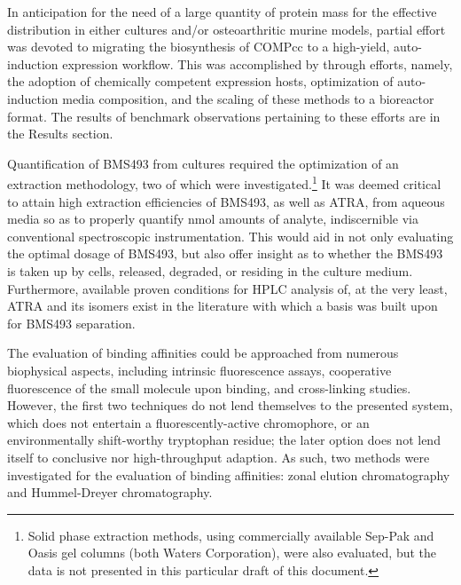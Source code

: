 \begin{refsection}
\begin{description}
\end{description}
In anticipation for the need of a large quantity of protein mass for the
effective distribution in either  cultures and/or 
osteoarthritic murine models, partial effort was devoted to migrating the
biosynthesis of COMPcc to a high-yield, auto-induction expression workflow. This
was accomplished by through efforts, namely, the adoption of 
chemically competent expression hosts, optimization of auto-induction media
composition, and the scaling of these methods to a bioreactor format. The
results of benchmark observations pertaining to these efforts are in the Results
section.

Quantification of BMS493 from cultures required the optimization of an
extraction methodology, two of which were investigated.\footnote{Solid phase
    extraction methods, using commercially available Sep-Pak  and Oasis
    gel columns (both Waters Corporation), were also evaluated, but the data is
not presented in this particular draft of this document.} It was deemed critical
to attain high extraction efficiencies of BMS493, as well as ATRA, from aqueous
media so as to properly quantify \si{\nano\mol} amounts of analyte,
indiscernible via conventional spectroscopic instrumentation. This would aid in
not only evaluating the optimal dosage of BMS493, but also offer insight as to
whether the BMS493 is taken up by cells, released, degraded, or residing in the
culture medium. Furthermore, available proven conditions for HPLC analysis of, at
the very least, ATRA and its isomers exist in the literature with which a basis
was built upon for BMS493
separation.\cite{Kim2010b,Chauveau-Duriot2010,Schaffer2010a,Kane2008b,DeLeenheer1982,Motto1989} 

The evaluation of binding affinities could be approached from numerous
biophysical aspects, including intrinsic fluorescence assays, cooperative
fluorescence of the small molecule upon binding, and cross-linking studies.
However, the first two techniques do not lend themselves to the presented
system, which does not entertain a fluorescently-active chromophore, or an
environmentally shift-worthy tryptophan residue; the later option does not lend
itself to conclusive nor high-throughput adaption. As such, two methods were
investigated for the evaluation of binding affinities: zonal elution
chromatography and Hummel-Dreyer chromatography.


\end{refsection}
